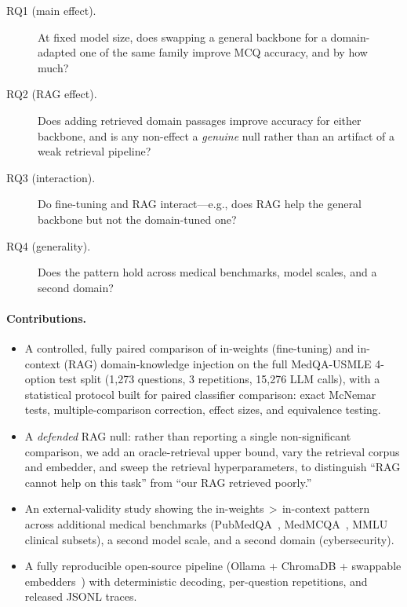 \documentclass[11pt,a4paper]{article}
\begin{document}
\begin{description}
  \item[RQ1 (main effect).] At fixed model size, does swapping a general backbone
    for a domain-adapted one of the same family improve MCQ accuracy, and by how
    much?
  \item[RQ2 (RAG effect).] Does adding retrieved domain passages improve accuracy
    for either backbone, and is any non-effect a \emph{genuine} null rather than
    an artifact of a weak retrieval pipeline?
  \item[RQ3 (interaction).] Do fine-tuning and RAG interact---e.g., does RAG help
    the general backbone but not the domain-tuned one?
  \item[RQ4 (generality).] Does the pattern hold across medical benchmarks, model
    scales, and a second domain?
\end{description}

\paragraph{Contributions.}
\begin{itemize}
  \item A controlled, fully paired comparison of in-weights (fine-tuning) and
    in-context (RAG) domain-knowledge injection on the full MedQA-USMLE 4-option
    test split (1{,}273 questions, 3 repetitions, 15{,}276 LLM calls), with a
    statistical protocol built for paired classifier comparison: exact McNemar
    tests, multiple-comparison correction, effect sizes, and equivalence testing.
  \item A \emph{defended} RAG null: rather than reporting a single
    non-significant comparison, we add an oracle-retrieval upper bound, vary the
    retrieval corpus and embedder, and sweep the retrieval hyperparameters, to
    distinguish ``RAG cannot help on this task'' from ``our RAG retrieved
    poorly.''
  \item An external-validity study showing the in-weights\,$>$\,in-context
    pattern across additional medical benchmarks
    (PubMedQA~\cite{jin2019pubmedqa}, MedMCQA~\cite{pal2022medmcqa},
    MMLU~\cite{hendrycks2021mmlu} clinical subsets), a second model scale, and a
    second domain (cybersecurity).
  \item A fully reproducible open-source pipeline (Ollama + ChromaDB +
    swappable embedders~\cite{nomic2024embed,jin2023medcpt,chromadb,ollama2024})
    with deterministic decoding, per-question repetitions, and released JSONL
    traces.
\end{itemize}
\end{document}
